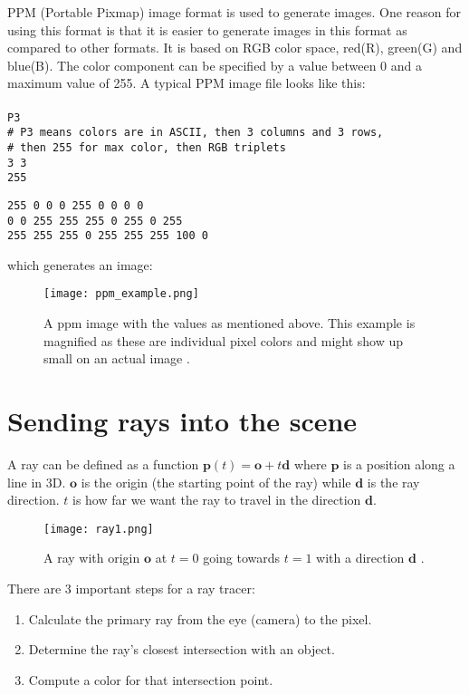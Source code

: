 \documentclass[11pt,a4paper]{article}
\begin{document}
	PPM (Portable Pixmap) image format is used to generate images. One reason for using this format is that it is easier to generate images in this format as compared to other formats. It is based on RGB color space, red(R), green(G) and blue(B). The color component can be specified by a value between 0 and a maximum value of 255. A typical PPM image file looks like this:\\
	\\
	\texttt{P3} \\
	\texttt{\# P3 means colors are in ASCII, then 3 columns and 3 rows,} \\
	\texttt{\# then 255 for max color, then RGB triplets}\\
	\texttt{3 3}\\
	\texttt{255}
	\begin{tabbing}
		\texttt{255 0 0 \hspace*{1.55cm} 0 255 0 \hspace*{1.98cm} 0 0 0}\\
		\texttt{0 0 255 \hspace*{1.55cm} 255 255 0 \hspace*{1.55cm} 255 0 255}\\
		\texttt{255 255 255 \hspace*{0.7cm} 0 255 255 \hspace*{1.53cm} 255 100 0}
	\end{tabbing}
	which generates an image:
	\begin{figure}[H]
		\centering
		\texttt{[image: ppm\_example.png]}
		\caption{\centering A ppm image with the values as mentioned above. This example is magnified as these are individual pixel colors and might show up small on an actual image \protect\cite{ppmformat}.}
	\end{figure}
	
	\section{Sending rays into the scene}
	A ray can be defined as a function $\boldsymbol{p}(t) = \boldsymbol{o} + t\boldsymbol{d}$ where $\boldsymbol{p}$ is a position along a line in 3D. $\boldsymbol{o}$ is the origin (the starting point of the ray) while $\boldsymbol{d}$ is the ray direction. $t$ is how far we want the ray to travel in the direction $\boldsymbol{d}$.\\
	\begin{figure}[H]
		\centering
		\texttt{[image: ray1.png]}
		\caption{\centering A ray with origin $\boldsymbol{o}$ at $t=0$ going towards $t=1$ with a direction $\boldsymbol{d}$ \protect\cite{Shirley2020RTW1}.}
	\end{figure}
	\noindent
	There are 3 important steps for a ray tracer:
	\begin{enumerate}
		\item Calculate the primary ray from the eye (camera) to the pixel.
		\item Determine the ray's closest intersection with an object.
		\item Compute a color for that intersection point.
	\end{enumerate}
	
\end{document}
